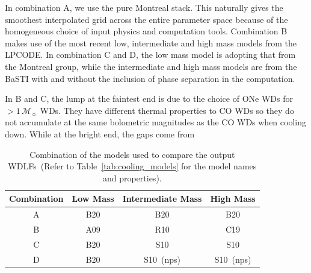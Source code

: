 \documentclass[fleqn,usenatbib]{rasti}
\newcommand{\msun}{\mathcal{M}_{\sun}}
\begin{document}
In combination A, we use the pure Montreal stack. This naturally gives the
smoothest interpolated grid across the entire parameter space because of the
homogeneous choice of input physics and computation tools. Combination B makes
use of the most recent low, intermediate and high mass models from the LPCODE.
In combination C and D, the low mass model is adopting that from the Montreal
group, while the intermediate and high mass models are from the BaSTI with and
without the inclusion of phase separation in the computation.

In B and C, the lump at the faintest end is due to the choice of ONe WDs for
$>1\,\msun$ WDs. They have different thermal properties to CO WDs so
they do not accumulate at the same bolometric magnitudes as the CO WDs when
cooling down. While at the bright end, the gaps come from 

\begin{table}
    \centering
    \begin{tabular}{c|ccc}
        Combination & Low Mass & Intermediate Mass & High Mass \\ \hline\hline
        A     & B20      & B20               & B20 \\
        B     & A09      & R10               & C19 \\
        C     & B20      & S10               & S10 \\
        D     & B20      & S10~(nps)         & S10~(nps) \\
    \end{tabular}
    \caption{Combination of the models used to compare the output WDLFs~(Refer
    to Table~\ref{tab:cooling_models} for the model names and properties).}
    \label{tab:cooling_model_combination}
\end{table}
\end{document}
